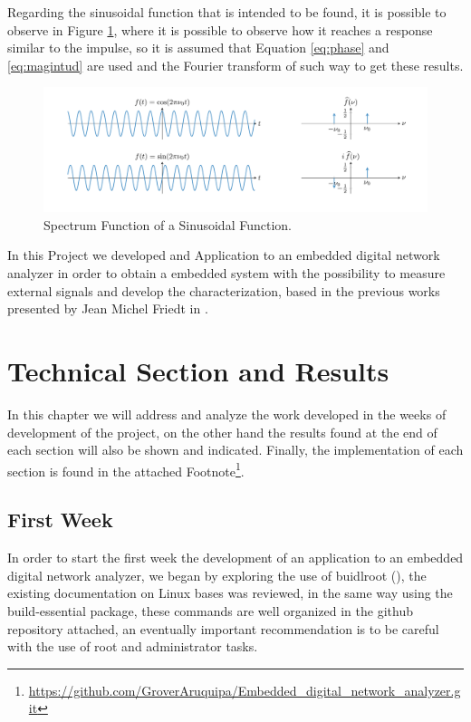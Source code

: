 \documentclass[12pt, twoside]{report}
\begin{document}
\begin{itemize}
    Regarding the sinusoidal function that is intended to be found, it is possible to observe in Figure \ref{fig:sinusoideal}, where it is possible to observe how it reaches a response similar to the impulse, so it is assumed that Equation \ref{eq:phase} and \ref{eq:magintud} are used and the Fourier transform of such way to get these results.
    \begin{figure}[!h]
    \centering
  \includegraphics[scale=0.4]{images/sinusoideal.png}
  \caption{Spectrum Function of a Sinusoidal Function.}
  \label{fig:sinusoideal}
    \end{figure}
    
    
    
\end{itemize}


\enlargethispage{\baselineskip}
In this Project we developed and Application to an embedded digital network analyzer in order to obtain a embedded system with the possibility to measure external signals and develop the characterization, based in the previous works presented by Jean Michel Friedt in \cite{Friedt2021a} .\\

\chapter{Technical Section and Results}
In this chapter we will address and analyze the work developed in the weeks of development of the project, on the other hand the results found at the end of each section will also be shown and indicated. Finally, the implementation of each section is found in the attached Footnote\footnote{\url{https://github.com/GroverAruquipa/Embedded_digital_network_analyzer.git}}.
\section{First Week}
In order to start the first week the development of an application to an embedded digital network analyzer, we began by exploring the use of buidlroot (\cite{Abdullah2007}), the existing documentation on Linux bases was reviewed, in the same way using the build-essential package, these commands are well organized in the github repository attached, an eventually important recommendation is to be careful with the use of root and administrator tasks.\\
\end{document}
